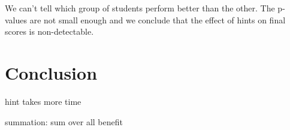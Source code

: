 \documentclass{sigchi}
\begin{document}
We can't tell which group of students perform better than the other. The p-values are not small enough and we conclude that the effect of hints on final scores is non-detectable.


\section{Conclusion}


hint takes more time

summation: sum over all benefit 

\balance{}

%


\end{document}

